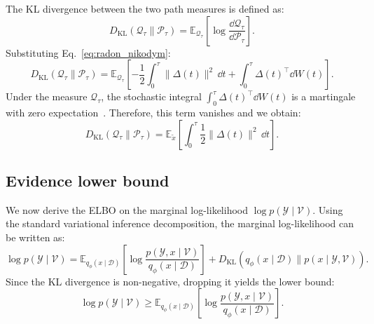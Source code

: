 \documentclass[preprint,12pt]{elsarticle}
\begin{document}
The KL divergence between the two path measures is defined as:
\begin{equation}
    D_{\mathrm{KL}}(\mathcal{Q}_\tau \parallel \mathcal{P}_\tau) = \mathbb{E}_{\mathcal{Q}_\tau} \left[ \log \frac{\dd \mathcal{Q}_\tau}{\dd \mathcal{P}_\tau} \right].
\end{equation}
Substituting Eq.~\eqref{eq:radon_nikodym}:
\begin{equation}
    D_{\mathrm{KL}}(\mathcal{Q}_\tau \parallel \mathcal{P}_\tau) = \mathbb{E}_{\mathcal{Q}_\tau} \left[ -\frac{1}{2} \int_0^\tau \|\Delta(t)\|^2\,\dd t + \int_0^\tau \Delta(t)^\top \dd W(t) \right].
\end{equation}
Under the measure $\mathcal{Q}_\tau$, the stochastic integral $\int_0^\tau \Delta(t)^\top \dd W(t)$ is a martingale with zero expectation~\citep{oksendal2003stochastic}. Therefore, this term vanishes and we obtain:
\begin{equation}
    D_{\mathrm{KL}}(\mathcal{Q}_\tau \parallel \mathcal{P}_\tau) = \mathbb{E}_{\tilde{x}} \left[ \int_0^\tau \frac{1}{2} \|\Delta(t)\|^2\,\dd t \right].
    \label{eq:kl_path_appndx}
\end{equation}

\subsection*{Evidence lower bound}

We now derive the ELBO on the marginal log-likelihood $\log p(\mathcal{Y} \mid \mathcal{V})$. Using the standard variational inference decomposition, the marginal log-likelihood can be written as:
\begin{equation}
    \log p(\mathcal{Y} \mid \mathcal{V}) = \mathbb{E}_{q_\phi(x \mid \mathcal{D})} \left[ \log \frac{p(\mathcal{Y}, x \mid \mathcal{V})}{q_\phi(x \mid \mathcal{D})} \right] + D_{\mathrm{KL}}(q_\phi(x \mid \mathcal{D}) \parallel p(x \mid \mathcal{Y}, \mathcal{V})).
\end{equation}
Since the KL divergence is non-negative, dropping it yields the lower bound:
\begin{equation}
    \log p(\mathcal{Y} \mid \mathcal{V}) \geq \mathbb{E}_{q_\phi(x \mid \mathcal{D})} \left[ \log \frac{p(\mathcal{Y}, x \mid \mathcal{V})}{q_\phi(x \mid \mathcal{D})} \right].
\end{equation}
\end{document}
